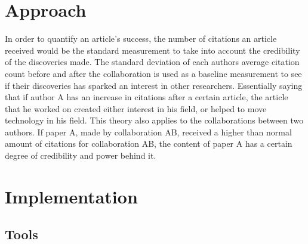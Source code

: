 \documentclass[10pt,journal,compsoc]{IEEEtran}
\begin{document}
\section{Approach}
\indent In order to quantify an article’s success, the number of citations an article received would be the standard measurement to take into account the credibility of the discoveries made. The standard deviation of each authors average citation count before and after the collaboration is used as a baseline measurement to see if their discoveries has sparked an interest in other researchers. Essentially saying that if author A has an increase in citations after a certain article, the article that he worked on created either interest in his field, or helped to move technology in his field. This theory also applies to the collaborations between two authors. If paper A, made by collaboration AB, received a higher than normal amount of citations for collaboration AB, the content of paper A has a certain degree of credibility and power behind it.

\section{Implementation}

\subsection{Tools}
\end{document}
